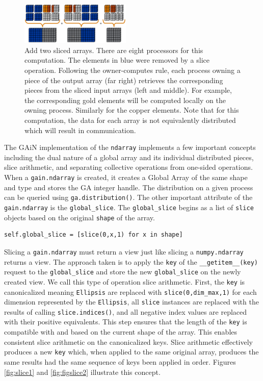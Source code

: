 \documentclass[preprint]{sigplanconf}
\begin{document}
\begin{figure}[htb]
\centering
\includegraphics[width=0.47\textwidth]{image2_crop.eps}
\caption{
Add two sliced arrays. There are eight processors for this computation.  The
elements in blue were removed by a slice operation. Following the
owner-computes rule, each process owning a piece of the output array (far
right) retrieves the corresponding pieces from the sliced input arrays (left
and middle). For example, the corresponding gold elements will be computed
locally on the owning process. Similarly for the copper elements.  Note that
for this computation, the data for each array is not equivalently distributed
which will result in communication.
}
\label{fig:3}
\end{figure}


The GAiN implementation of the \verb=ndarray= implements a few important
concepts including the dual nature of a global array and its individual
distributed pieces, slice arithmetic, and separating collective operations
from one-sided operations. When a \verb=gain.ndarray= is created, it creates a
Global Array of the same shape and type and stores the GA integer handle. The
distribution on a given process can be queried using \verb=ga.distribution()=.
The other important attribute of the \verb=gain.ndarray= is the
\verb=global_slice=.  The \verb=global_slice= begins as a list of \verb=slice=
objects based on the original \verb=shape= of the array.

\begin{verbatim}
self.global_slice = [slice(0,x,1) for x in shape]
\end{verbatim}

Slicing a \verb=gain.ndarray= must return a view just like slicing a
\verb=numpy.ndarray= returns a view. The approach taken is to apply the
\verb=key= of the \verb=__getitem__(key)= request to the \verb=global_slice=
and store the new \verb=global_slice= on the newly created view. We call this
type of operation slice arithmetic. First, the \verb=key= is canonicalized
meaning \verb=Ellipsis= are replaced with \verb=slice(0,dim_max,1)= for each
dimension represented by the \verb=Ellipsis=, all \verb=slice= instances are
replaced with the results of calling \verb=slice.indices()=, and all negative
index values are replaced with their positive equivalents. This step ensures
that the length of the \verb=key= is compatible with and based on the current
shape of the array.  This enables consistent slice arithmetic on the
canonicalized keys. Slice arithmetic effectively produces a new \verb=key=
which, when applied to the same original array, produces the same results had
the same sequence of keys been applied in order. Figures \ref{fig:slice1}
and \ref{fig:figslice2} illustrate this concept.
\end{document}
